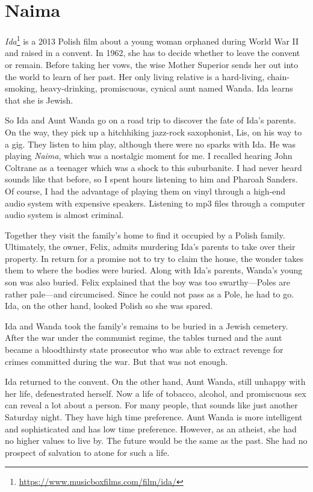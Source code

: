 \section{Naima}

\emph{Ida}\footnote{\url{https://www.musicboxfilms.com/film/ida/}} is a 2013 Polish film about a young woman orphaned during World War II and raised in a convent. In 1962, she has to decide whether to leave the convent or remain. Before taking her vows, the wise Mother Superior sends her out into the world to learn of her past. Her only living relative is a hard-living, chain-smoking, heavy-drinking, promiscuous, cynical aunt named Wanda. Ida learns that she is Jewish.

So Ida and Aunt Wanda go on a road trip to discover the fate of Ida's parents. On the way, they pick up a hitchhiking jazz-rock saxophonist, Lis, on his way to a gig. They listen to him play, although there were no sparks with Ida. He was playing \emph{Naima}, which was a nostalgic moment for me. I recalled hearing John Coltrane as a teenager which was a shock to this suburbanite. I had never heard sounds like that before, so I spent hours listening to him and Pharoah Sanders. Of course, I had the advantage of playing them on vinyl through a high-end audio system with expensive speakers. Listening to mp3 files through a computer audio system is almost criminal.

Together they visit the family's home to find it occupied by a Polish family. Ultimately, the owner, Felix, admits murdering Ida's parents to take over their property. In return for a promise not to try to claim the house, the wonder takes them to where the bodies were buried. Along with Ida's parents, Wanda's young son was also buried. Felix explained that the boy was too swarthy---Poles are rather pale---and circumcised. Since he could not pass as a Pole, he had to go. Ida, on the other hand, looked Polish so she was spared.

Ida and Wanda took the family's remains to be buried in a Jewish cemetery. After the war under the communist regime, the tables turned and the aunt became a bloodthirsty state prosecutor who was able to extract revenge for crimes committed during the war. But that was not enough.

Ida returned to the convent. On the other hand, Aunt Wanda, still unhappy with her life, defenestrated herself. Now a life of tobacco, alcohol, and promiscuous sex can reveal a lot about a person. For many people, that sounds like just another Saturday night. They have high time preference. Aunt Wanda is more intelligent and sophisticated and has low time preference. However, as an atheist, she had no higher values to live by. The future would be the same as the past. She had no prospect of salvation to atone for such a life.

